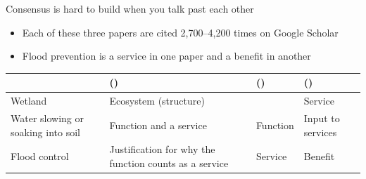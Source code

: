 \documentclass[aspectratio=169]{beamer}
\begin{document}
\begin{frame}{Consensus is hard to build when you talk past each other}

    \begin{itemize}
        \item Each of these three papers are cited 2,700--4,200 times on Google Scholar
        \item Flood prevention is a service in one paper and a benefit in another
    \end{itemize}


    \vspace{.7cm}
    \small
    \centering
    {\hypersetup{citecolor=black} %
    \renewcommand{\arraystretch}{1.3}
    \begin{tabular}{>{\raggedright\arraybackslash}p{} >{\raggedright\arraybackslash}p{} >{\raggedright\arraybackslash}p{} >{\raggedright\arraybackslash}p{}}
        \toprule
         & \citeauthor{haines-youngLinksBiodiversityEcosystem2010} (\citeyear{haines-youngLinksBiodiversityEcosystem2010}) & \citeauthor{gomez-baggethunClassifyingValuingEcosystem2013} (\citeyear{gomez-baggethunClassifyingValuingEcosystem2013}) & \citeauthor{boydWhatAreEcosystem2007} (\citeyear{boydWhatAreEcosystem2007}) \\
        \midrule
        \rowcolor{gray!15}
        Wetland & Ecosystem (structure) & & Service \\
        Water slowing or soaking into soil & Function and a service & Function & Input to services \\
        \rowcolor{gray!15}
        Flood control & Justification for why the function counts as a service & Service & Benefit \\
        \bottomrule
    \end{tabular}
    }
    \raggedright

\end{frame}
\end{document}
